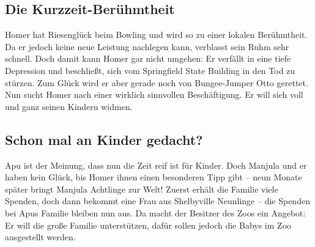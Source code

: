 
	
\subsection{Die Kurzzeit-Berühmtheit}
Homer hat Riesenglück beim Bowling und wird so zu einer lokalen Berühmtheit. Da er jedoch keine neue Leistung nachlegen kann, verblasst sein Ruhm sehr schnell. Doch damit kann Homer gar nicht umgehen: Er verfällt in eine tiefe Depression und beschließt, sich vom Springfield State Building in den Tod zu stürzen. Zum Glück wird er aber gerade noch von Bungee-Jumper Otto gerettet. Nun sucht Homer nach einer wirklich sinnvollen Beschäftigung. Er will sich voll und ganz seinen Kindern widmen.


	
\subsection{Schon mal an Kinder gedacht?}\label{BABF03}
Apu ist der Meinung, dass nun die Zeit reif ist für Kinder. Doch Manjula und er haben kein Glück, bis Homer ihnen einen besonderen Tipp gibt -- neun Monate später bringt Manjula Achtlinge zur Welt! Zuerst erhält die Familie viele Spenden, doch dann bekommt eine Frau aus Shelbyville Neunlinge -- die Spenden bei Apus Familie bleiben nun aus. Da macht der Besitzer des Zoos ein Angebot: Er will die große Familie unterstützen, dafür sollen jedoch die Babys im Zoo ausgestellt werden.

